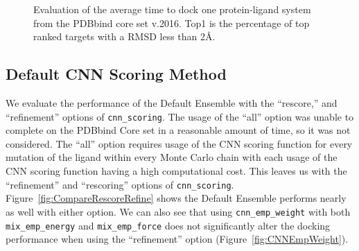 \documentclass[linenumbers,doublespacing]{bmcart}
\begin{document}
\begin{figure}[tbh]
        \caption{Evaluation of the average time to dock one protein-ligand system from the PDBbind core set v.2016. Top1 is the percentage of top ranked targets with a RMSD less than 2{\AA}.}
        \label{fig:OptimalRescore}
\end{figure}    

\subsection{Default CNN Scoring Method}
 We evaluate the performance of the Default Ensemble with the ``rescore,'' and ``refinement'' options of \texttt{cnn\_scoring}. The usage of the ``all'' option was unable to complete on the PDBbind Core set in a reasonable amount of time, so it was not considered. The ``all'' option requires usage of the CNN scoring function for every mutation of the ligand within every Monte Carlo chain with each usage of the CNN scoring function having a high computational cost. This leaves us with the ``refinement'' and ``rescoring'' options of \texttt{cnn\_scoring}. Figure~\ref{fig:CompareRescoreRefine} shows the Default Ensemble performs nearly as well with either option. We can also see that using \texttt{cnn\_emp\_weight} with both \texttt{mix\_emp\_energy} and \texttt{mix\_emp\_force} does not significantly alter the docking performance when using the ``refinement'' option (Figure~\ref{fig:CNNEmpWeight}).
\end{document}

